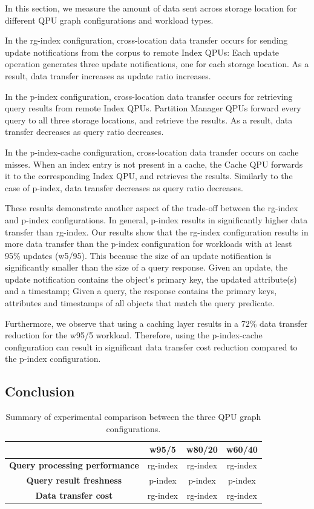 In this section, we measure the amount of data sent across storage location for different QPU graph configurations and
workload types.

In the rg-index configuration, cross-location data transfer occurs for sending update notifications from the corpus
to remote Index QPUs:
Each update operation generates three update notifications, one for each storage location.
As a result, data transfer increases as update ratio increases.

In the p-index configuration, cross-location data transfer occurs for retrieving query results from remote Index QPUs.
Partition Manager QPUs forward every query to all three storage locations, and retrieve the results.
As a result, data transfer decreases as query ratio decreases.

In the p-index-cache configuration, cross-location data transfer occurs on cache misses.
When an index entry is not present in a cache, the Cache QPU forwards it to the corresponding Index QPU, and retrieves the
results.
Similarly to the case of p-index, data transfer decreases as query ratio decreases.

These results demonstrate another aspect of the trade-off between the rg-index and p-index configurations.
In general, p-index results in significantly higher data transfer than rg-index.
Our results show that the rg-index configuration results in more data transfer than the p-index configuration for workloads with at least 95\% updates (w5/95).
This because the size of an update notification is significantly smaller than the size of a query response.
Given an update, the update notification contains the object's primary key, the updated attribute(s) and a timestamp;
Given a query, the response contains the primary keys, attributes and timestamps of all objects that match the query predicate.

Furthermore, we observe that using a caching layer results in a 72\% data transfer reduction for the w95/5 workload.
Therefore, using the p-index-cache configuration can result in significant data transfer cost reduction compared to
the p-index configuration.

\subsection{Conclusion}

\begin{table}[H]
\centering
\begin{tabular}{|c||c|c|c||}
\hline
& \textbf{w95/5} & \textbf{w80/20} & \textbf{w60/40}\\
\hline
\textbf{Query processing performance} & rg-index & rg-index & rg-index \\
\hline
\textbf{Query result freshness} & p-index & p-index & p-index \\
\hline
\textbf{Data transfer cost} & rg-index & rg-index & rg-index \\
\hline
\end{tabular}
\caption{Summary of experimental comparison between the three QPU graph configurations.}
\label{tab:ycsb_summary}
\end{table}


